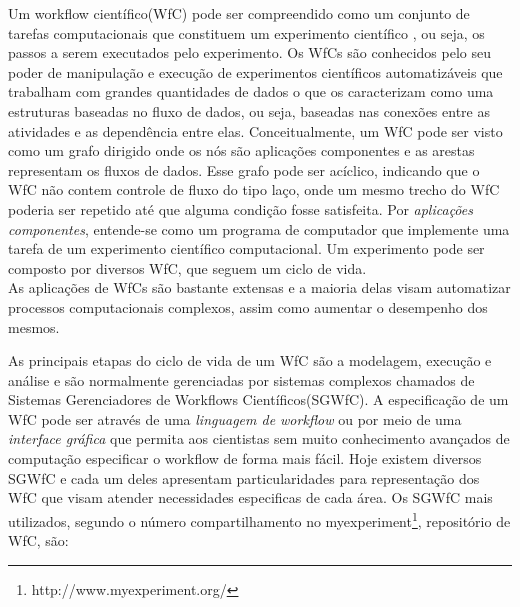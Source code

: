 \documentclass[a4paper,10pt]{article}
\begin{document}
Um workflow científico(WfC) pode ser compreendido como um conjunto de tarefas computacionais que constituem um experimento científico \cite{Junior2012}, ou seja, os passos a serem executados pelo experimento. Os WfCs são conhecidos pelo seu poder de manipulação e execução de experimentos científicos automatizáveis que trabalham com grandes quantidades de dados o que os caracterizam como uma estruturas baseadas no fluxo de dados, ou seja, baseadas nas conexões entre as atividades e as dependência entre elas. Conceitualmente, um WfC pode ser visto como um grafo dirigido onde os nós são aplicações componentes e as arestas representam os fluxos de dados. Esse grafo pode ser acíclico, indicando que o WfC não contem controle de fluxo do tipo laço, onde um mesmo trecho do WfC poderia ser repetido até que alguma condição fosse satisfeita. Por \textit{aplicações componentes}, entende-se como um programa de computador que implemente uma tarefa de um experimento científico computacional\cite{Junior2012}. Um experimento pode ser composto por diversos WfC, que seguem um ciclo de vida.\\

	As aplicações de WfCs são bastante extensas e a maioria delas visam automatizar processos computacionais complexos, assim como aumentar o desempenho dos mesmos.
	
	As principais etapas do ciclo de vida de um WfC são a modelagem, execução e análise e são normalmente gerenciadas por sistemas complexos chamados de Sistemas Gerenciadores de Workflows Científicos(SGWfC). A especificação de um WfC pode ser através de uma \textit{linguagem de workflow} ou por meio de uma \textit{interface gráfica} que permita aos cientistas sem muito conhecimento avançados de computação especificar o workflow de forma mais fácil. Hoje existem diversos SGWfC e cada um deles apresentam particularidades para representação dos WfC que visam atender necessidades especificas de cada área. Os SGWfC mais utilizados, segundo o número compartilhamento no myexperiment\footnote{http://www.myexperiment.org/}, repositório de WfC, são:
	
\end{document}
